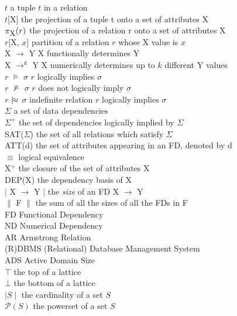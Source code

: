 \begin{symbolindex}
{\begin{tabbing}
$t$ \>    		 a tuple $t$ in a relation\\
$t[$X$]$ \>  		 the projection of a tuple t onto a set of attributes X\\
$\pi_{\mbox{\small{X}}}(r)$ \> 		 the projection of a relation r onto a set of
attributes X\\
$r[$X, $x]$ \>		 partition of a relation $r$ whose X value is $x$ \\
X $\to$ Y \> 	   	 X functionally determines Y\\
X $\to^k$ Y \> 	   	 X numerically determines up to $k$ different
Y values\\
$r$ $\models$ $\sigma$ \>  	 $r$ logically implies $\sigma$ \\
$r$ $\not \models$ $\sigma$ \>   $r$ does not logically imply $\sigma$ \\
$r$ $\mid\!\approx$ $\sigma$ \>   indefinite relation $r$ logically implies $\sigma$ \\
$\Sigma$ \>  		 a set of data dependencies\\
$\Sigma^+$ \>		   the set of dependencies logically implied by $\Sigma$\\
SAT($\Sigma$) \>	 the set of all relations which satisfy $\Sigma$ \\
ATT(d)  \> 		  the set of attributes appearing in an FD, denoted by d \\
$\equiv$        \>   	logical equivalence \\
X$^+$   \>   		the  closure of the set of attributes X \\
DEP(X)  \>   		 the dependency  basis of X \\
$\mid$ X $\to$ Y $\mid$\>   the {\em size} of an FD  X $\to$ Y \\
$\|$ F $\|$\>   the sum of all the sizes of all the FDs in F \\
 FD \>			Functional Dependency \\
 ND \>			Numerical Dependency \\
 AR \>			Armstrong Relation \\
 (R)DBMS \>		(Relational) Database Management System \\
 ADS \>			Active Domain Size \\
 $\top$ \>		the top of a lattice \\
 $\bot$ \>		the bottom of a lattice \\
 $\mid S \mid$ \>	the cardinality of a set $S$ \\
 ${\mathcal P}(S)$ \>	the powerset of a set $S$ \\

\end{tabbing}}
\end{symbolindex}

